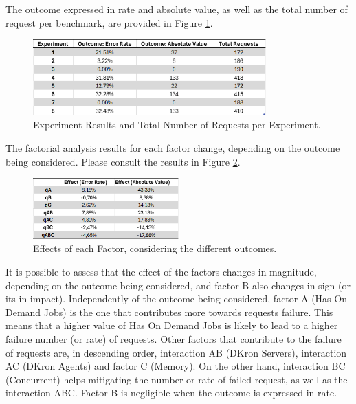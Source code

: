 \documentclass[runningheads]{llncs}
\begin{document}
The outcome expressed in rate and absolute value, as well as the total number of request per benchmark, are provided in Figure \ref{fig:results_totrequests}.

\begin{figure}[H]
    \centering
    \includegraphics[width=0.8\textwidth]{media/factorial_outcome_per_y_plus_totrequests.png}
    \caption{Experiment Results and Total Number of Requests per Experiment.}
    \label{fig:results_totrequests}
\end{figure}

The factorial analysis results for each factor change, depending on the outcome being considered. Please consult the results in Figure \ref{fig:factors_effects}.

\begin{figure}[H]
    \centering
    \includegraphics[width=0.5\textwidth]{media/Effects_Factors.png} \caption{Effects of each Factor, considering the different outcomes.}
    \label{fig:factors_effects}
\end{figure}

It is possible to assess that the effect of the factors changes in magnitude, depending on the outcome being considered, and factor B also changes in sign (or its in impact).
Independently of the outcome being considered, factor A (Has On Demand Jobs) is the one that contributes more towards requests failure. This means that a higher value of Has On Demand Jobs is likely to lead to a higher failure number (or rate) of requests. Other factors that contribute to the failure of requests are, in descending order, interaction AB (DKron Servers), interaction AC (DKron Agents) and factor C (Memory). On the other hand, interaction BC (Concurrent) helps mitigating the number or rate of failed request, as well as the interaction ABC.
Factor B is negligible when the outcome is expressed in rate.
\end{document}
